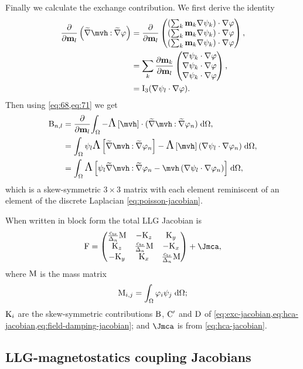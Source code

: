 {Finally we calculate the exchange contribution.
We first derive the identity
\begin{equation}
  \begin{aligned}
    \pd{}{\mv_l} \left(\gradv \mvh \compdot \gradv \tbf\right)
    &= \pd{}{\mv_l} \threevecdup{\left( \sum_k \mv_k \grad \sbf_k \right) \cdot \grad \tbf}, \\
    &=  \sum_k \pd{\mv_k}{\mv_l} \threevecdup{\grad \sbf_k \cdot \grad \tbf}, \\
    &=  \Idm_3 \bigb{ \grad \sbf_l \cdot \grad \tbf }.
    \label{eq:71}
  \end{aligned}
\end{equation}
Then using \cref{eq:68,eq:71} we get
\begin{equation}
  \begin{aligned}
   \Bm_{n,l} &=  \pd{}{\mv_l} \intd{- \skewm{\mvh} \cdot (\gradv \mvh \compdot \gradv \tbf_n)} ,\\
    &= \intd{ \sbf_l \skewm{\gradv \mvh \compdot \gradv \tbf_n}
       - \skewm{\mvh} \left( \grad \sbf_l \cdot \grad \tbf_n \right)}, \\
     &= \intd{\skewm{ \sbf_l \gradv \mvh \compdot \gradv \tbf_n
       - \mvh \left( \grad \sbf_l \cdot \grad \tbf_n \right)}},
   \label{eq:exc-jacobian}
   \end{aligned}
 \end{equation}
 which is a skew-symmetric $3\times 3$ matrix with each element reminiscent of an element of the discrete Laplacian \cref{eq:poisson-jacobian}.

When written in block form the total LLG Jacobian is
\begin{equation}
  \Fm =
  \begin{pmatrix}
    \jts \Mm    & -\Km_z       & \Km_y \\
    \Km_z         & \jts\Mm    & -\Km_x \\
    -\Km_y        & \Km_x        & \jts \Mm
  \end{pmatrix} + \Jmca,
  \label{eq:llg-jacobian}
\end{equation}
where $\mathrm{M}$ is the mass matrix
\begin{equation}
  \label{eq:mass-matrix}
  \mathrm{M}_{i,j} = {\int_{\Omega} {\varphi_i \psi_j} {\; \mathrm{{d}}} {\Omega}};
\end{equation}
$\mathrm{K}_i$ are the skew-symmetric contributions $\mathrm{B}$, $\mathrm{C}'$ and $\mathrm{D}$ of \cref{eq:exc-jacobian,eq:hca-jacobian,eq:field-damping-jacobian}; and $\Jmca$ is from \cref{eq:hca-jacobian}.


\subsection{LLG-magnetostatics coupling Jacobians}
\label{sec:llg-magn-coupl}

}
